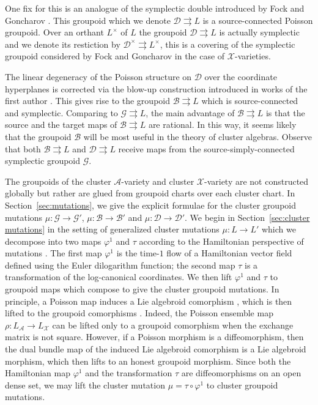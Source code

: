 \documentclass{amsart}
\numberwithin{equation}{section}
\newcommand{\cA}{\mathcal{A}}
\newcommand{\cB}{\mathcal{B}}
\newcommand{\cD}{\mathcal{D}}
\newcommand{\cG}{\mathcal{G}}
\newcommand{\cX}{\mathcal{X}}
\newcommand{\rra}{\rightrightarrows}
\begin{document}
One fix for this is an analogue of the symplectic double introduced by Fock and Goncharov \cite{FG09c}.
This groupoid which we denote $\cD \rra L$ is a source-connected Poisson groupoid.
Over an orthant $L^\times$ of $L$ the groupoid $\cD \rra L$ is actually symplectic and we denote its restiction by $\cD^\times \rra L^\times$, this is a covering of the symplectic groupoid considered by Fock and Goncharov in the case of $\cX$-varieties.

The linear degeneracy of the Poisson structure on $\cD$ over the coordinate hyperplanes is corrected via the blow-up construction introduced in works of the first author \cite{Li13, GL14}.
This gives rise to the groupoid $\cB \rra L$ which is source-connected and symplectic.
Comparing to $\cG \rra L$, the main advantage of $\cB \rra L$ is that the source and the target maps of $\cB \rra L$ are rational.
In this way, it seems likely that the groupoid $\cB$ will be most useful in the theory of cluster algebras.
Observe that both $\cB \rra L$ and $\cD \rra L$ receive maps from the source-simply-connected symplectic groupoid $\cG$.

The groupoids of the cluster $\cA$-variety and cluster $\cX$-variety are not constructed globally but rather are glued from groupoid charts over each cluster chart.
In Section~\ref{sec:mutations}, we give the explicit formulae for the cluster groupoid mutations $\mu: \cG \to \cG'$, $\mu: \cB \to \cB'$ and $\mu: \cD \to \cD'$.
We begin in Section~\ref{sec:cluster mutations} in the setting of generalized cluster mutations $\mu: L \to L'$ which we decompose into two maps $\varphi^1$ and $\tau$ according to the Hamiltonian perspective of mutations \cite{FG09a, GNR17}.
The first map $\varphi^1$ is the time-$1$ flow of a Hamiltonian vector field defined using the Euler dilogarithm function; the second map $\tau$ is a transformation of the log-canonical coordinates.
We then lift $\varphi^1$ and $\tau$ to groupoid maps which compose to give the cluster groupoid mutations.
In principle, a Poisson map induces a Lie algebroid comorphism \cite{HM90}, which is then lifted to the groupoid comorphisms \cite{Cat04, CDW13}.
Indeed, the Poisson ensemble map $\rho: L_\cA \to L_\cX$ can be lifted only to a groupoid comorphism when the exchange matrix is not square.
However, if a Poisson morphism is a diffeomorphism, then the dual bundle map of the induced Lie algebroid comorphism is a Lie algebroid morphism, which then lifts to an honest groupoid morphism.
Since both the Hamiltonian map $\varphi^1$ and the transformation $\tau$ are diffeomorphisms on an open dense set, we may lift the cluster mutation $\mu = \tau \circ \varphi^1$ to cluster groupoid mutations.
\bigskip
\end{document}
